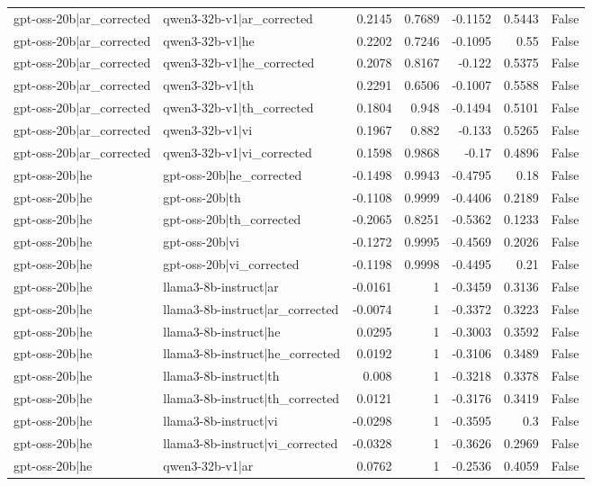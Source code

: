 \begin{table}
\begin{tabular}{l l r r r r l}
gpt-oss-20b|ar_corrected & qwen3-32b-v1|ar_corrected & 0.2145 & 0.7689 & -0.1152 & 0.5443 & False \\
gpt-oss-20b|ar_corrected & qwen3-32b-v1|he & 0.2202 & 0.7246 & -0.1095 & 0.55 & False \\
gpt-oss-20b|ar_corrected & qwen3-32b-v1|he_corrected & 0.2078 & 0.8167 & -0.122 & 0.5375 & False \\
gpt-oss-20b|ar_corrected & qwen3-32b-v1|th & 0.2291 & 0.6506 & -0.1007 & 0.5588 & False \\
gpt-oss-20b|ar_corrected & qwen3-32b-v1|th_corrected & 0.1804 & 0.948 & -0.1494 & 0.5101 & False \\
gpt-oss-20b|ar_corrected & qwen3-32b-v1|vi & 0.1967 & 0.882 & -0.133 & 0.5265 & False \\
gpt-oss-20b|ar_corrected & qwen3-32b-v1|vi_corrected & 0.1598 & 0.9868 & -0.17 & 0.4896 & False \\
gpt-oss-20b|he & gpt-oss-20b|he_corrected & -0.1498 & 0.9943 & -0.4795 & 0.18 & False \\
gpt-oss-20b|he & gpt-oss-20b|th & -0.1108 & 0.9999 & -0.4406 & 0.2189 & False \\
gpt-oss-20b|he & gpt-oss-20b|th_corrected & -0.2065 & 0.8251 & -0.5362 & 0.1233 & False \\
gpt-oss-20b|he & gpt-oss-20b|vi & -0.1272 & 0.9995 & -0.4569 & 0.2026 & False \\
gpt-oss-20b|he & gpt-oss-20b|vi_corrected & -0.1198 & 0.9998 & -0.4495 & 0.21 & False \\
gpt-oss-20b|he & llama3-8b-instruct|ar & -0.0161 & 1 & -0.3459 & 0.3136 & False \\
gpt-oss-20b|he & llama3-8b-instruct|ar_corrected & -0.0074 & 1 & -0.3372 & 0.3223 & False \\
gpt-oss-20b|he & llama3-8b-instruct|he & 0.0295 & 1 & -0.3003 & 0.3592 & False \\
gpt-oss-20b|he & llama3-8b-instruct|he_corrected & 0.0192 & 1 & -0.3106 & 0.3489 & False \\
gpt-oss-20b|he & llama3-8b-instruct|th & 0.008 & 1 & -0.3218 & 0.3378 & False \\
gpt-oss-20b|he & llama3-8b-instruct|th_corrected & 0.0121 & 1 & -0.3176 & 0.3419 & False \\
gpt-oss-20b|he & llama3-8b-instruct|vi & -0.0298 & 1 & -0.3595 & 0.3 & False \\
gpt-oss-20b|he & llama3-8b-instruct|vi_corrected & -0.0328 & 1 & -0.3626 & 0.2969 & False \\
gpt-oss-20b|he & qwen3-32b-v1|ar & 0.0762 & 1 & -0.2536 & 0.4059 & False \\

\end{tabular}
\end{table}

